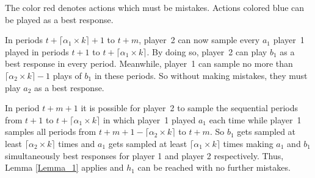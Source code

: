 \documentclass[11.5pt]{article}
\begin{document}
\begin{table}[htbp]
\centering
{}
\small
The color red denotes actions which must be mistakes. Actions colored blue can be played as a best response.
\end{table}


In periods $t+\lceil \alpha_1 \times k \rceil + 1$ to $t + m$, player~2 can now sample every $a_1$ player~1 played in periods $t+1$ to $t+\lceil \alpha_1 \times k \rceil$. By doing so, player~2 can play $b_1$ as a best response in every period. Meanwhile, player~1 can sample no more than $\lceil \alpha_2 \times k \rceil - 1$ plays of $b_1$ in these periods. So without making mistakes, they must play $a_2$ as a best response.

In period $t + m + 1$ it is possible for player~2 to sample the sequential periods from $t + 1$ to $t + \lceil \alpha_1 \times k \rceil$ in which player~1 played $a_1$ each time while player~1 samples all periods from $t+m+1-\lceil \alpha_2 \times k \rceil$ to $t + m$. So $b_1$ gets sampled at least $\lceil \alpha_2 \times k \rceil$ times and $a_1$ gets sampled at least $\lceil \alpha_1 \times k \rceil$ times making $a_1$ and $b_1$ simultaneously best responses for player 1 and player 2 respectively. Thus, Lemma \ref{Lemma_1} applies and $h_1$ can be reached with no further mistakes. 
\end{document}
